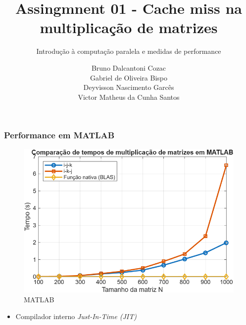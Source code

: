 \documentclass[utf8]{beamer}
\theoremstyle{definition}
\begin{document}
	\author{ Bruno Dalcantoni Cozac \\
		  	 Gabriel de Oliveira Bispo\\
			 Deyvisson Nascimento Garcês \\
			 Victor Matheus da Cunha Santos \\ }
	\title{Assingmnent 01 - Cache miss na multiplicação de matrizes}
	\subtitle{Introdução à computação paralela e medidas de performance}
	\subject{}

	\begin{frame}[plain]
		\maketitle
	\end{frame}




\begin{frame}
		\frametitle{Performance em MATLAB}
	\begin{figure}[H]
		\centering
		\includegraphics[width=0.5\linewidth]{../matlab/untitled1.png}
		\caption{MATLAB}
		\label{fig:matmultr2022}
	\end{figure}
	
\end{frame}
\begin{frame}
	\begin{itemize}
		\item Compilador interno \textit{Just-In-Time (JIT)}
	\end{itemize}
\end{frame}
\end{document}
